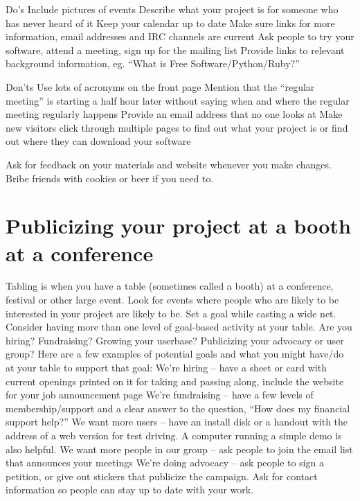 Do’s
Include pictures of events
Describe what your project is for someone who has never heard of it
Keep your calendar up to date
Make sure links for more information, email addresses and IRC channels are current
Ask people to try your software, attend a meeting, sign up for the mailing list
Provide links to relevant background information, eg. “What is Free Software/Python/Ruby?” 

Don’ts
Use lots of acronyms on the front page
Mention that the “regular meeting” is starting a half hour later without saying when and where the regular meeting regularly happens
Provide an email address that no one looks at
Make new visitors click through multiple pages to find out what your project is or find out where they can download your software

Ask for feedback on your materials and website whenever you make changes. Bribe friends with cookies or beer if you need to.

\section{Publicizing your project at a booth at a conference}

Tabling is when you have a table (sometimes called a booth) at a conference, festival or other large event. Look for events where people who are likely to be interested in your project are likely to be. Set a goal while casting a wide net. Consider having more than one level of goal-based activity at your table. Are you hiring? Fundraising? Growing your userbase? Publicizing your advocacy or user group?  Here are a few examples of potential goals and what you might have/do at your table to support that goal:
We’re hiring -- have a sheet or card with current openings printed on it for taking and passing along, include the website for your job announcement page
We’re fundraising -- have a few levels of membership/support and a clear answer to the question, “How does my financial support help?”
We want more users -- have an install disk or a handout with the address of a web version for test driving. A computer running a simple demo is also helpful. 
We want more people in our group -- ask people to join the email list that announces your meetings
We’re doing advocacy -- ask people to sign a petition, or give out stickers that publicize the campaign. Ask for contact information so people can stay up to date with your work.  

